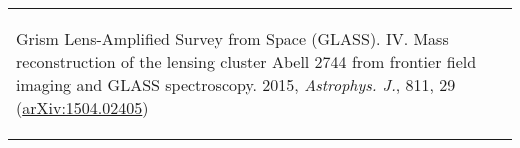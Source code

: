 \documentclass[10pt]{article}
\begin{document}
\begin{longtable}{p{17cm}}
\begin{list}{}{\leftmargin=0.5em}
      Grism Lens-Amplified Survey from Space (GLASS). IV. Mass reconstruction of the lensing cluster Abell 2744 from frontier
      field imaging and GLASS spectroscopy. 2015, \textit{Astrophys. J.}, 811, 29 (\href{http://arxiv.org/abs/1504.02405}{arXiv:1504.02405}) 
\end{list}  \\
\end{longtable}

\vspace{-2em}
\end{document}
